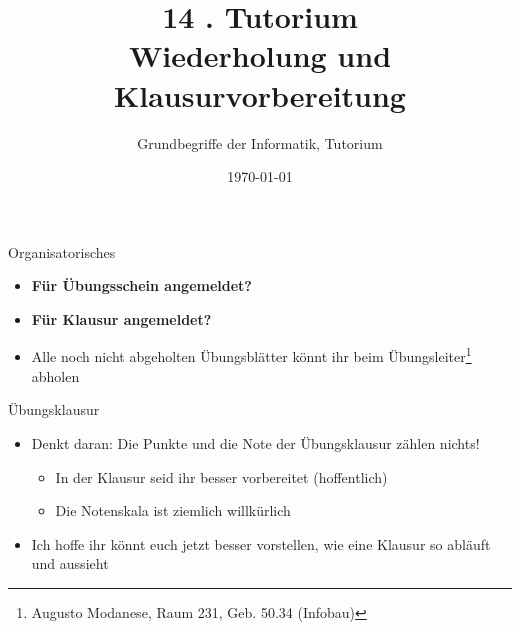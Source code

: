 




\title[\Moritz{Reguläre Sprachen und }Wiederholung]{14 . Tutorium\\ Wiederholung und Klausurvorbereitung}
\subtitle{Grundbegriffe der Informatik, Tutorium \hashtag\mytutnumber}
\date{\today}


\titleframe

\begin{frame}{Organisatorisches}
	\begin{itemize}
		\item \textbf{Für Übungsschein angemeldet?}
		\item \textbf{Für Klausur angemeldet?}
		\item Alle noch nicht abgeholten Übungsblätter könnt ihr beim Übungsleiter\footnote{Augusto Modanese, Raum 231, Geb. 50.34 (Infobau)} abholen
	\end{itemize}
\end{frame}


\begin{frame}{Übungsklausur}
	\begin{itemize}
		\item Denkt daran: Die Punkte und die Note der Übungsklausur zählen nichts!\begin{itemize}
			\item In der Klausur seid ihr besser vorbereitet (hoffentlich)
			\item Die Notenskala ist ziemlich willkürlich
		\end{itemize}
		\item Ich hoffe ihr könnt euch jetzt besser vorstellen, wie eine Klausur so abläuft und aussieht
	\end{itemize}
\end{frame}


\roadmap



